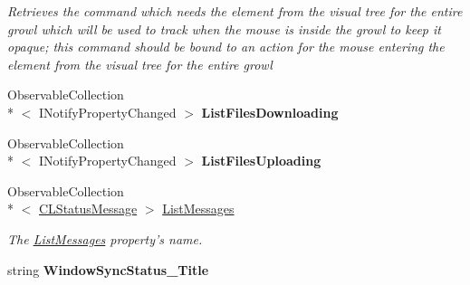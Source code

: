 \begin{DoxyCompactItemize}
\begin{DoxyCompactList}\small\item\em Retrieves the command which needs the element from the visual tree for the entire growl which will be used to track when the mouse is inside the growl to keep it opaque; this command should be bound to an action for the mouse entering the element from the visual tree for the entire growl \end{DoxyCompactList}\item 
\hypertarget{class_cloud_api_public_1_1_event_message_receiver_1_1_event_message_receiver_ad2d3db1835bfcf5614e0a47e7fd850b1}{Observable\-Collection\\*
$<$ I\-Notify\-Property\-Changed $>$ {\bfseries List\-Files\-Downloading}}\label{class_cloud_api_public_1_1_event_message_receiver_1_1_event_message_receiver_ad2d3db1835bfcf5614e0a47e7fd850b1}

\item 
\hypertarget{class_cloud_api_public_1_1_event_message_receiver_1_1_event_message_receiver_af6dc9a7dd86e3ee205413a0ecc12e1ab}{Observable\-Collection\\*
$<$ I\-Notify\-Property\-Changed $>$ {\bfseries List\-Files\-Uploading}}\label{class_cloud_api_public_1_1_event_message_receiver_1_1_event_message_receiver_af6dc9a7dd86e3ee205413a0ecc12e1ab}

\item 
Observable\-Collection\\*
$<$ \hyperlink{class_cloud_api_public_1_1_event_message_receiver_1_1_status_1_1_c_l_status_message}{C\-L\-Status\-Message} $>$ \hyperlink{class_cloud_api_public_1_1_event_message_receiver_1_1_event_message_receiver_a5499e363b5a8920bbbb70fe529dd6feb}{List\-Messages}
\begin{DoxyCompactList}\small\item\em The \hyperlink{class_cloud_api_public_1_1_event_message_receiver_1_1_event_message_receiver_a5499e363b5a8920bbbb70fe529dd6feb}{List\-Messages} property's name. \end{DoxyCompactList}\item 
\hypertarget{class_cloud_api_public_1_1_event_message_receiver_1_1_event_message_receiver_a45b7136a4f3ee4989305d2d27fd65703}{string {\bfseries Window\-Sync\-Status\-\_\-\-Title}}\label{class_cloud_api_public_1_1_event_message_receiver_1_1_event_message_receiver_a45b7136a4f3ee4989305d2d27fd65703}


\end{DoxyCompactItemize}

